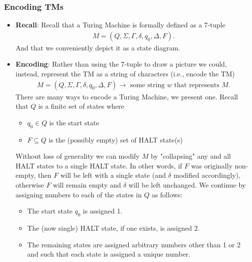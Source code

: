 \documentclass{report}
\begin{document}
    \subsubsection{Encoding TMs}
    \begin{itemize}
        \item \textbf{Recall}: Recall that a Turing Machine is formally defined as a 7-tuple
            \begin{align*}
                M = (Q, \Sigma, \Gamma, \delta, q_{0}, \Delta, F)
            .\end{align*}
            \bigbreak \noindent 
            And that we conveniently depict it as a state diagram. 
        \item \textbf{Encoding}: Rather than using the 7-tuple to draw a picture we could, instead, represent the TM as a string of characters (i.e., encode the TM)
            \begin{align*}
                M = (Q, \Sigma, \Gamma, \delta, q_{0}, \Delta, F) \to \text{ some string $w$ that represents $M$}
            .\end{align*}
            \bigbreak \noindent 
            There are many ways to encode a Turing Machine, we present one.
            \bigbreak \noindent 
            Recall that $Q$ is a finite set of states where
            \begin{itemize}
                \item $q_{0} \in Q$ is the start state
                \item $F \subseteq Q$ is the (possibly empty) set of HALT state(s)
            \end{itemize}
            \bigbreak \noindent 
            Without loss of generality we can modify $M$ by "collapsing" any and all HALT states to a single HALT state.
            \bigbreak \noindent 
            In other words, if $F$ was originally non-empty, then $F$ will be left with a single state (and $\delta$ modified accordingly), otherwise $F$ will remain empty and $\delta$ will be left unchanged.
            \bigbreak \noindent 
            We continue by assigning numbers to each of the states in $Q$ as follows:
            \begin{itemize}
                \item The start state $q_{0}$ is assigned 1.
                \item The (now single) HALT state, if one exists, is assigned 2.
                \item The remaining states are assigned arbitrary numbers other than 1 or 2 and such that each state is assigned a unique number.

\end{itemize}
\end{itemize}
\end{document}
